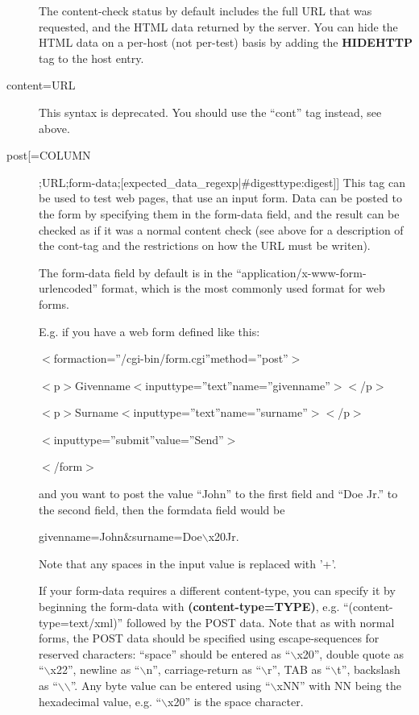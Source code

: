\begin{description}
  The content-check status by default includes the full URL that was
  requested, and the HTML data returned by the server. You can hide
  the HTML data on a per-host (not per-test) basis by adding the
  \textbf{HIDEHTTP} tag to the host entry. 



 

\item[content=URL] This syntax is deprecated. You should use the
  ``cont'' tag instead, see above. 


 

\item[post[=COLUMN];URL;form-data;[expected\_data\_regexp|\#digesttype:digest]]
  This tag can be used to test web pages, that use an input form. Data
  can be posted to the form by specifying them in the form-data field,
  and the result can be checked as if it was a normal content check
  (see above for a description of the cont-tag and the restrictions on
  how the URL must be writen). 


  The form-data field by default is in the
  ``application/x-www-form-urlencoded'' format, which is the most
  commonly used format for web forms. 



  E.g. if you have a web form defined like this: 


  
$<$formaction=''/cgi-bin/form.cgi''method=''post''$>$  
 
$<$p$>$Givenname$<$inputtype=''text''name=''givenname''$>$$<$/p$>$  
 
$<$p$>$Surname$<$inputtype=''text''name=''surname''$>$$<$/p$>$  
 
$<$inputtype=''submit''value=''Send''$>$  
 
$<$/form$>$ 


  and you want to post the value ``John'' to the first field and ``Doe
  Jr.'' to the second field, then the formdata field would be 



  
givenname=John\&surname=Doe$\backslash$x20Jr. 


  Note that any spaces in the input value is replaced with '+'. 


  If your form-data requires a different content-type, you can specify
  it by beginning the form-data with \textbf{(content-type=TYPE)},
  e.g. ``(content-type=text/xml)'' followed by the POST data. Note
  that as with normal forms, the POST data should be specified using
  escape-sequences for reserved characters: ``space'' should be
  entered as ``$\backslash$x20'', double quote as ``$\backslash$x22'',
  newline as ``$\backslash$n'', carriage-return as ``$\backslash$r'',
  TAB as ``$\backslash$t'', backslash as
  ``$\backslash$$\backslash$''. Any byte value can be entered using
  ``$\backslash$xNN'' with NN being the hexadecimal value,
  e.g. ``$\backslash$x20'' is the space character. 




\end{description}

